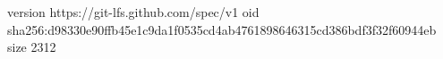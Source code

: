 version https://git-lfs.github.com/spec/v1
oid sha256:d98330e90ffb45e1c9da1f0535cd4ab4761898646315cd386bdf3f32f60944eb
size 2312
